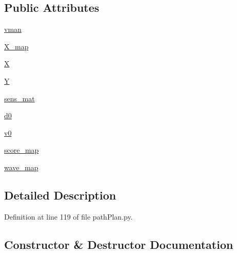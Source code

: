 \subsection*{Public Attributes}
\begin{DoxyCompactItemize}
\item 
\mbox{\hyperlink{classpath_plan_1_1_path_planner_a8e31f83f0d8983286bb3746da568af81}{vman}}
\item 
\mbox{\hyperlink{classpath_plan_1_1_path_planner_a726f4b4f55f7fb557eabceb962e25871}{X\+\_\+map}}
\item 
\mbox{\hyperlink{classpath_plan_1_1_path_planner_ac7e6ed6310bc8e1064e42af17b8a5948}{X}}
\item 
\mbox{\hyperlink{classpath_plan_1_1_path_planner_a4e78ffd0fb9df91a15d01ca5cb615d24}{Y}}
\item 
\mbox{\hyperlink{classpath_plan_1_1_path_planner_a3a23d66cb64460f9c5ae8968071323c2}{sens\+\_\+mat}}
\item 
\mbox{\hyperlink{classpath_plan_1_1_path_planner_a508cce57c5e6deb7880fe2ef631c983e}{d0}}
\item 
\mbox{\hyperlink{classpath_plan_1_1_path_planner_a56e0e1649ae12d5c72409041c2aaeae9}{v0}}
\item 
\mbox{\hyperlink{classpath_plan_1_1_path_planner_aec7491cbbb5ea16f5fbeceecbb405efd}{score\+\_\+map}}
\item 
\mbox{\hyperlink{classpath_plan_1_1_path_planner_a3db343c9859cd328507cee118e1df6b3}{wave\+\_\+map}}
\end{DoxyCompactItemize}


\subsection{Detailed Description}


Definition at line 119 of file path\+Plan.\+py.



\subsection{Constructor \& Destructor Documentation}
\mbox{\label{classpath_plan_1_1_path_planner_a4725d91c2d54372bbfecfce0a71a3552}} 
